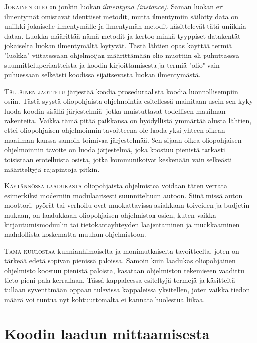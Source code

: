 \documentclass[openany]{book}
\newcommand{\newthought}[1]{\smallskip\textsc{#1}}
\newcommand{\eng}[1]{\textit{(#1)}}
\newcommand{\new}[1]{\textit{\gls{#1}}}
\newcommand{\neweng}[2]{\new{#1} \eng{#2}}
\begin{document}
\newthought{Jokainen olio} on jonkin luokan \neweng{ilmentyma}{instance}. Saman luokan eri
ilmentymät omistavat identtiset metodit, mutta ilmentymiin säilötty data on uniikki jokaiselle
ilmentymälle ja ilmentymän metodit käsittelevät tätä uniikkia dataa. Luokka määrittää nämä metodit
ja kertoo minkä tyyppiset datakentät jokaiselta luokan ilmentymältä löytyvät. Tästä lähtien
opas käyttää termiä "luokka" viitatessaan ohjelmoijan määrittämään olio muottiin eli puhuttaessa
suunnitteluperiaatteista ja koodin kirjoittamisesta ja termiä "olio" vain puhuessaan selkeästi
koodissa sijaitsevasta luokan ilmentymästä.

\newthought{Tälläinen jaottelu} järjestää koodia proseduraalista koodia luonnollisempiin osiin.
Tästä syystä oliopohjaista ohjelmointia esitellessä mainitaan usein sen kyky luoda koodin sisällä
järjestelmiä, jotka muistuttavat todellisen maailman rakenteita. Vaikka tämä pitää paikkansa on
hyödyllistä ymmärtää alusta lähtien, ettei oliopohjaisen ohjelmoinnin tavoitteena ole luoda yksi
yhteen oikean maailman kanssa samoin toimivaa järjestelmää. Sen sijaan oikea oliopohjaisen
ohjelmoinnin tavoite on luoda järjestelmä, joka koostuu pienistä tarkasti toisistaan erotelluista
osista, jotka kommunikoivat keskenään vain selkeästi määriteltyjä rajapintoja pitkin.

\newthought{Käytännössä laadukasta} oliopohjaista ohjelmistoa voidaan täten verrata esimerkiksi
moderniin modulaarisesti suunniteltuun autoon. Siinä missä auton moottori, pyörät tai verhoilu
ovat muokattavissa asiakkaan toiveiden ja budjetin mukaan, on laadukkaan oliopohjaisen ohjelmiston
osien, kuten vaikka kirjautumismoduulin tai tietokantayhteyden laajentaminen ja muokkaaminen
mahdollista koskematta muuhun ohjelmistoon.

\newthought{Tämä kuulostaa} kunnianhimoiselta ja monimutkaiselta tavoitteelta, joten on tärkeää
edetä sopivan pienissä paloissa. Samoin kuin laadukas oliopohjainen ohjelmisto koostuu pienistä
paloista, kasataan ohjelmiston tekemiseen vaadittu tieto pieni pala kerrallaan. Tässä kappaleessa
esiteltyjä termejä ja käsitteitä tullaan syventämään oppaan tulevissa kappaleissa yksitellen,
joten vaikka tiedon määrä voi tuntua nyt kohtuuttomalta ei kannata huolestua liikaa.


\section{Koodin laadun mittaamisesta}
\label{koodin laadusta}
\end{document}
